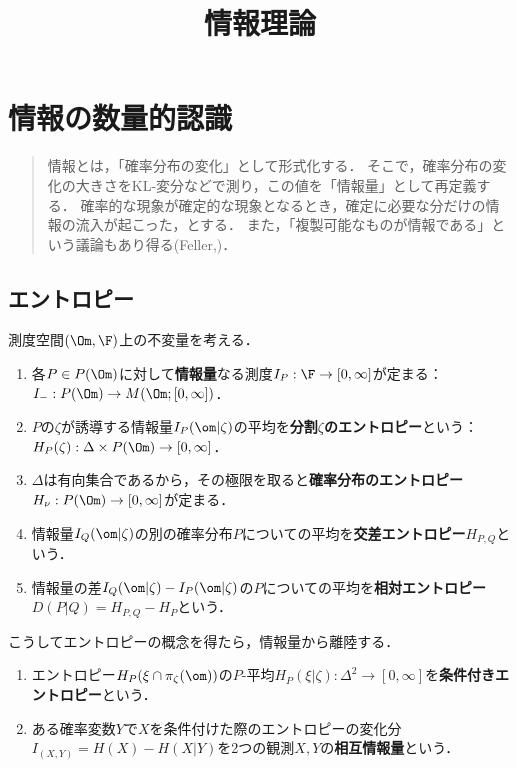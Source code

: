 \documentclass[uplatex,dvipdfmx]{jsreport}
\title{情報理論}
\author{}
\begin{document}
\tableofcontents

\chapter{情報の数量的認識}

\begin{quotation}
    情報とは，「確率分布の変化」として形式化する．
    そこで，確率分布の変化の大きさをKL-変分などで測り，この値を「情報量」として再定義する．
    確率的な現象が確定的な現象となるとき，確定に必要な分だけの情報の流入が起こった，とする．
    また，「複製可能なものが情報である」という議論もあり得る(Feller,\cite{野口悠紀雄})．
\end{quotation}

\section{エントロピー}

\begin{tcolorbox}[colframe=ForestGreen, colback=ForestGreen!10!white,breakable,colbacktitle=ForestGreen!40!white,coltitle=black,fonttitle=\bfseries\sffamily,
title=]
    測度空間$(\Om,\F)$上の不変量を考える．
    \begin{enumerate}
        \item 各$P\in P(\Om)$に対して\textbf{情報量}なる測度$I_P:\F\to[0,\infty]$が定まる：$I_-:P(\Om)\to M(\Om;[0,\infty])$．
        \item $P$の$\zeta$が誘導する情報量$I_P(\om|\zeta)$の平均を\textbf{分割$\zeta$のエントロピー}という：$H_P(\zeta):\Delta\times P(\Om)\to[0,\infty]$．
        \item $\Delta$は有向集合であるから，その極限を取ると\textbf{確率分布のエントロピー}$H_\nu:P(\Om)\to[0,\infty]$が定まる．
        \item 情報量$I_Q(\om|\zeta)$の別の確率分布$P$についての平均を\textbf{交差エントロピー}$H_{P,Q}$という．
        \item 情報量の差$I_Q(\om|\zeta)-I_P(\om|\zeta)$の$P$についての平均を\textbf{相対エントロピー}$D(P|Q)=H_{P,Q}-H_P$という．
    \end{enumerate}
    こうしてエントロピーの概念を得たら，情報量から離陸する．
    \begin{enumerate}
        \item エントロピー$H_P(\xi\cap\pi_\zeta(\om))$の$P$-平均$H_P(\xi|\zeta):\Delta^2\to[0,\infty]$を\textbf{条件付きエントロピー}という．
        \item ある確率変数$Y$で$X$を条件付けた際のエントロピーの変化分$I_{(X,Y)}=H(X)-H(X|Y)$を2つの観測$X,Y$の\textbf{相互情報量}という．
    \end{enumerate}
\end{tcolorbox}
\end{document}

